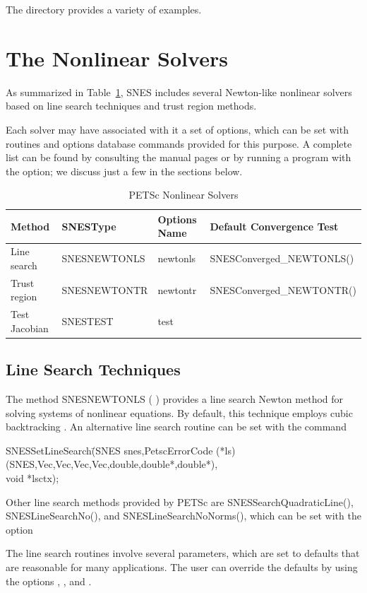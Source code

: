 The directory  provides
a variety of examples.


\section{The Nonlinear Solvers}
\label{sec_nlsolvers}

As summarized in Table~\ref{tab_snesdefaults}, SNES includes several
Newton-like nonlinear solvers based on line search techniques and
trust region methods.

Each solver may have associated with it a set of options, which can be
set with routines and options database commands provided for this
purpose.  A complete list can be found by consulting the manual pages
or by running a program with the  option; we discuss just a
few in the sections below.

\begin{table}
\begin{center}
\begin{tabular}{llll}
{\bf Method}    &{\bf SNESType}& {\bf Options Name}    &{\bf Default Convergence Test}\\
\hline
Line search     & SNESNEWTONLS   & newtonls    & SNESConverged\_NEWTONLS()\\
Trust region    & SNESNEWTONTR   & newtontr   & SNESConverged\_NEWTONTR()\\
Test Jacobian   & SNESTEST        & test  & \\
\hline
\end{tabular}
\end{center}
\caption{PETSc Nonlinear Solvers}
\label{tab_snesdefaults}
\end{table}

\subsection{Line Search Techniques} 

The method SNESNEWTONLS ( ) provides a line
search Newton method for solving systems of nonlinear equations.  By
default, this technique employs cubic backtracking \cite{dennis:83}.
An alternative line search routine can be set with the command
\begin{tabbing}
  SNESSetLineSearch\=(SNES snes,PetscErrorCode (*ls)(SNES,Vec,Vec,Vec,Vec,double,double*,double*),\\
                   \>void *lsctx);
\end{tabbing}
Other line search methods provided by PETSc are
SNESSearchQuadraticLine(), SNESLineSearchNo(), and SNESLineSearchNoNorms(),
which can be set with the option 
\begin{tabbing}
\end{tabbing}
The line search routines involve several parameters, which are set
to defaults that are reasonable for many applications.  The user
can override the defaults by using the options
, 
, and 
. 

